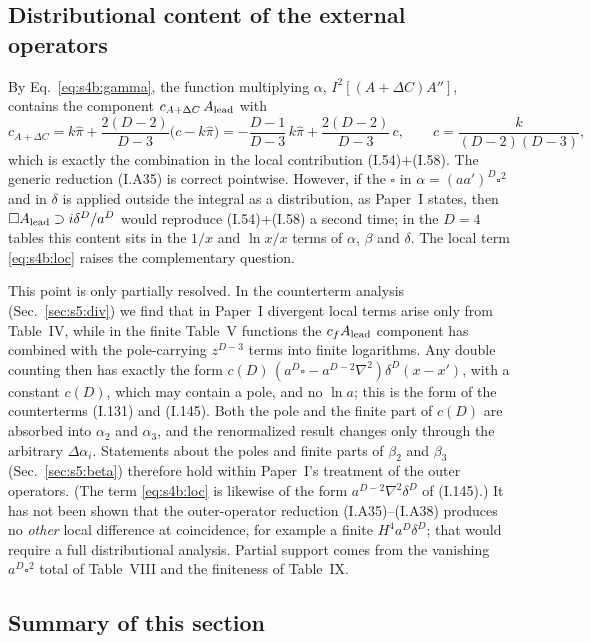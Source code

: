 \documentclass[aps,prd,onecolumn,10pt,nofootinbib,floatfix]{revtex4-2}
\newcommand{\PI}{Paper~I}
\newcommand{\eqI}[1]{(I.#1)}
\newcommand{\pihat}{\hat\pi}
\begin{document}
\subsection{Distributional content of the external operators}
\label{sec:s4b:distr}

By Eq.~\eqref{eq:s4b:gamma}, the function multiplying $\alpha$, $I^2[(A+\Delta C)A'']$, contains the component
$c_{A+\Delta C}\,A_{\rm lead}$ with
\begin{equation}
c_{A+\Delta C}=k\pihat+\frac{2(D-2)}{D-3}\big(c-k\pihat\big)=-\frac{D-1}{D-3}\,k\pihat+\frac{2(D-2)}{D-3}\,c ,\qquad
c=\frac{k}{(D-2)(D-3)} ,
\end{equation}
which is exactly the combination in the local contribution \eqI{54}$+$\eqI{58}. The generic reduction \eqI{A35} is
correct pointwise. However, if the $\square$ in $\alpha=(aa')^D\square^2$ and in $\delta$ is applied outside the
integral as a distribution, as \PI{} states, then $\square A_{\rm lead}\supset i\delta^D/a^D$ would reproduce
\eqI{54}$+$\eqI{58} a second time; in the $D=4$ tables this content sits in the $1/x$ and $\ln x/x$ terms of $\alpha$,
$\beta$ and $\delta$. The local term \eqref{eq:s4b:loc} raises the complementary question.

This point is only partially resolved. In the counterterm analysis (Sec.~\ref{sec:s5:div}) we find that in \PI{}
divergent local terms arise only from Table~IV, while in the finite Table~V functions the $c_fA_{\rm lead}$ component has
combined with the pole-carrying $z^{D-3}$ terms into finite logarithms. Any double counting then has exactly the form
$c(D)\,(a^D\square-a^{D-2}\nabla^2)\delta^D(x-x')$, with a constant $c(D)$, which may contain a pole, and no $\ln a$; this is the form
of the counterterms \eqI{131} and \eqI{145}. Both the pole and the finite part of $c(D)$ are absorbed into $\alpha_2$ and $\alpha_3$, and
the renormalized result changes only through the arbitrary $\Delta\alpha_i$. Statements about the poles and finite parts of $\beta_2$ and
$\beta_3$ (Sec.~\ref{sec:s5:beta}) therefore hold within \PI's treatment of the outer operators. (The term \eqref{eq:s4b:loc} is likewise of the form $a^{D-2}\nabla^2\delta^D$ of
\eqI{145}.) It has not been shown that the outer-operator reduction \eqI{A35}--\eqI{A38} produces no \emph{other} local
difference at coincidence, for example a finite $H^4a^D\delta^D$; that would require a full distributional analysis.
Partial support comes from the vanishing $a^D\square^2$ total of Table~VIII and the finiteness of Table~IX.

\subsection{Summary of this section}
\label{sec:s4b:summary}
\end{document}
